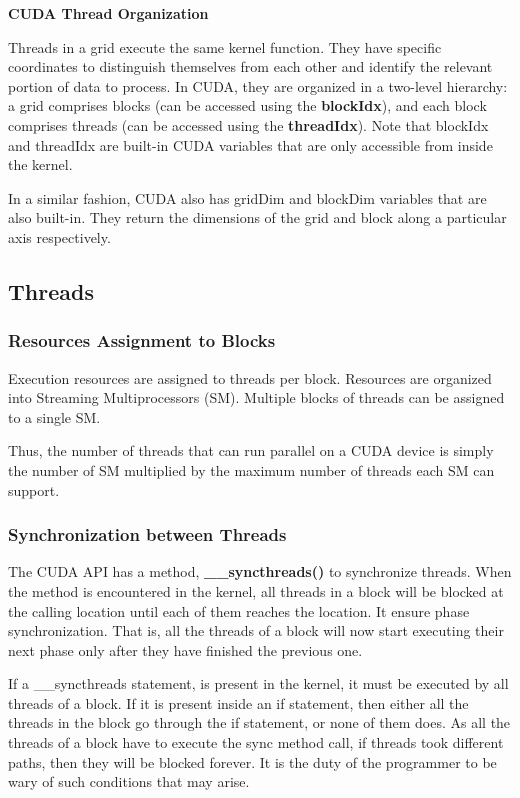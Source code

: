 \documentclass[../notes.tex]{subfiles}
\begin{document}
\textbf{CUDA Thread Organization}

Threads in a grid execute the same kernel function. They have specific coordinates to distinguish themselves from each other and identify the relevant portion of data to process. In CUDA, they are organized in a two-level hierarchy: a grid comprises blocks (can be accessed using the \textbf{blockIdx}), and each block comprises threads (can be accessed using the \textbf{threadIdx}). Note that blockIdx and threadIdx are built-in CUDA variables that are only accessible from inside the kernel.

In a similar fashion, CUDA also has gridDim and blockDim variables that are also built-in. They return the dimensions of the grid and block along a particular axis respectively.

\subsection{Threads}
\subsubsection{Resources Assignment to Blocks}
Execution resources are assigned to threads per block. Resources are organized into Streaming Multiprocessors (SM). Multiple blocks of threads can be assigned to a single SM.

Thus, the number of threads that can run parallel on a CUDA device is simply the number of SM multiplied by the maximum number of threads each SM can support.

\subsubsection{Synchronization between Threads}
The CUDA API has a method, \textbf{\_\_syncthreads()} to synchronize threads. When the method is encountered in the kernel, all threads in a block will be blocked at the calling location until each of them reaches the location. It ensure phase synchronization. That is, all the threads of a block will now start executing their next phase only after they have finished the previous one.

If a \_\_syncthreads statement, is present in the kernel, it must be executed by all threads of a block. If it is present inside an if statement, then either all the threads in the block go through the if statement, or none of them does. As all the threads of a block have to execute the sync method call, if threads took different paths, then they will be blocked forever. It is the duty of the programmer to be wary of such conditions that may arise.
\end{document}
